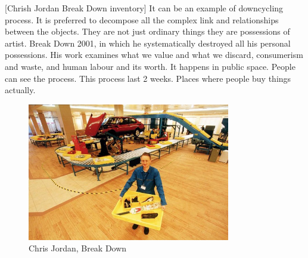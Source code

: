[Chrish Jordan Break Down inventory]  It can be an example of downcycling process. It is preferred to decompose all the complex link and relationships between the objects. They are not just ordinary things they are possessions of artist. Break Down 2001, in which he systematically destroyed all his personal possessions. His work examines what we value and what we discard, consumerism and waste, and human labour and its worth. It happens in public space. People can see the process. This process last 2 weeks. Places where people buy things actually.


\begin{figure}[h!]
  \centering
  \includegraphics[height=6cm]{graphics/ChrisJordan_BreakDown.jpg}
  \caption{Chris Jordan, Break Down}
  \label{fig:ChrisJordan_BreakDown}
\end{figure}






